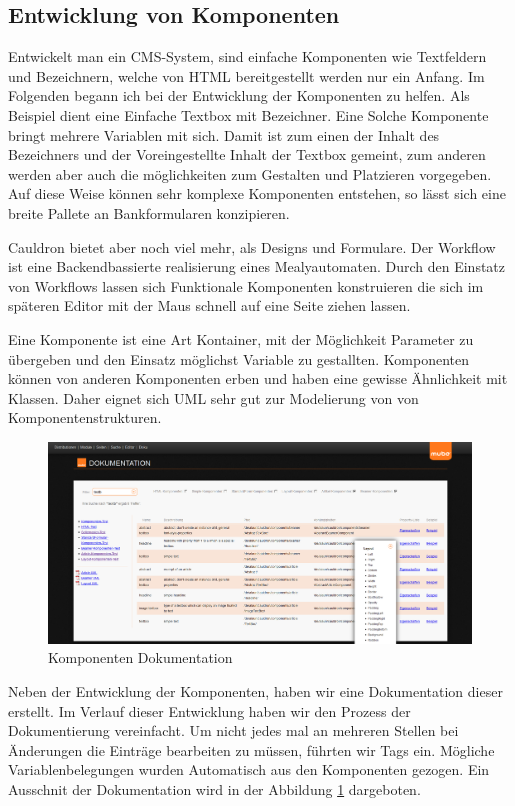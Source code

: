 \documentclass[12pt]{article}
\begin{document}
\subsection{Entwicklung von Komponenten}

Entwickelt man ein CMS-System, sind einfache Komponenten wie Textfeldern und Bezeichnern, welche von HTML bereitgestellt werden
nur ein Anfang. Im Folgenden begann ich bei der Entwicklung der Komponenten zu helfen. Als Beispiel dient eine Einfache Textbox
mit Bezeichner. Eine Solche Komponente bringt mehrere Variablen mit sich. Damit ist zum einen der Inhalt des Bezeichners und der
Voreingestellte Inhalt der Textbox gemeint, zum anderen werden aber auch die möglichkeiten zum Gestalten und Platzieren vorgegeben.
Auf diese Weise können sehr komplexe Komponenten entstehen, so lässt sich eine breite Pallete an Bankformularen konzipieren.

Cauldron bietet aber noch viel mehr, als Designs und Formulare. Der Workflow ist eine Backendbassierte realisierung eines 
Mealyautomaten. Durch den Einstatz von Workflows lassen sich Funktionale Komponenten konstruieren die sich im späteren Editor
mit der Maus schnell auf eine Seite ziehen lassen.

Eine Komponente ist eine Art Kontainer, mit der Möglichkeit Parameter zu übergeben und den Einsatz möglichst Variable zu gestallten.
Komponenten können von anderen Komponenten erben und haben eine gewisse Ähnlichkeit mit Klassen. Daher eignet sich UML sehr gut zur
Modelierung von von Komponentenstrukturen.

\begin{figure}[h]
	\centering
	\includegraphics[width=1.0\textwidth]{DokuPage.png}
	\caption{Komponenten Dokumentation}
	\label{fig:DokuPage}
\end{figure}

Neben der Entwicklung der Komponenten, haben wir eine Dokumentation dieser erstellt. Im Verlauf dieser Entwicklung haben wir
den Prozess der Dokumentierung vereinfacht. Um nicht jedes mal an mehreren Stellen bei Änderungen die Einträge bearbeiten zu müssen,
führten wir Tags ein. Mögliche Variablenbelegungen wurden Automatisch aus den Komponenten gezogen. Ein Ausschnit der Dokumentation
wird in der Abbildung \ref{fig:DokuPage} dargeboten.
\end{document}
